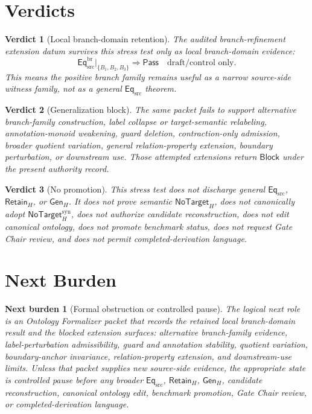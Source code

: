 \documentclass[11pt]{article}
\newcommand{\EqSrc}{\mathsf{Eq}_{\mathrm{src}}}
\newcommand{\EqBr}{\mathsf{Eq}_{\mathrm{src}}^{\mathrm{br}}}
\newcommand{\RetainH}{\mathsf{Retain}_{H}}
\newcommand{\GenH}{\mathsf{Gen}_{H}}
\newcommand{\NoTargetH}{\mathsf{NoTarget}_{H}}
\newcommand{\NoTargetSyn}{\mathsf{NoTarget}_{H}^{\mathrm{syn}}}
\newcommand{\Pass}{\mathsf{Pass}}
\newcommand{\Block}{\mathsf{Block}}
\newtheorem{verdict}{Verdict}
\newtheorem{nextburden}{Next burden}
\begin{document}
\section{Verdicts}

\begin{verdict}[Local branch-domain retention]
The audited branch-refinement extension datum survives this stress test
only as local branch-domain evidence:
\[
    \EqBr\big|_{\{B_{1},B_{2},B_{3}\}} \Rightarrow \Pass
    \quad\text{draft/control only.}
\]
This means the positive branch family remains useful as a narrow
source-side witness family, not as a general \(\EqSrc\) theorem.
\end{verdict}

\begin{verdict}[Generalization block]
The same packet fails to support alternative branch-family construction,
label collapse or target-semantic relabeling, annotation-monoid
weakening, guard deletion, contraction-only admission, broader quotient
variation, general relation-property extension, boundary perturbation, or
downstream use. Those attempted extensions return \(\Block\) under the
present authority record.
\end{verdict}

\begin{verdict}[No promotion]
This stress test does not discharge general \(\EqSrc\), \(\RetainH\), or
\(\GenH\). It does not prove semantic \(\NoTargetH\), does not
canonically adopt \(\NoTargetSyn\), does not authorize candidate
reconstruction, does not edit canonical ontology, does not promote
benchmark status, does not request Gate Chair review, and does not permit
completed-derivation language.
\end{verdict}

\section{Next Burden}

\begin{nextburden}[Formal obstruction or controlled pause]
The logical next role is an Ontology Formalizer packet that records the
retained local branch-domain result and the blocked extension surfaces:
alternative branch-family evidence, label-perturbation admissibility,
guard and annotation stability, quotient variation, boundary-anchor
invariance, relation-property extension, and downstream-use limits.
Unless that packet supplies new source-side evidence, the appropriate
state is controlled pause before any broader \(\EqSrc\), \(\RetainH\),
\(\GenH\), candidate reconstruction, canonical ontology edit, benchmark
promotion, Gate Chair review, or completed-derivation language.
\end{nextburden}
\end{document}
